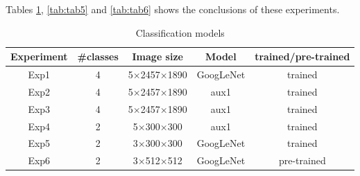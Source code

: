 Tables \ref{tab:tab4}, \ref{tab:tab5} and \ref{tab:tab6} shows the conclusions of these experiments.

\begin{table}[!ht]
    \centering
    \begin{tabular}{|c|c|c|c|c|}
        \hline
        Experiment & \#classes & Image size & Model & trained/pre-trained\\
        \hline\hline
        Exp1 & 4 & 5$\times$2457$\times$1890 & GoogLeNet & trained \\
        \hline
        Exp2 & 4 & 5$\times$2457$\times$1890 & aux1 & trained \\
        \hline
        Exp3 & 4 & 5$\times$2457$\times$1890 & aux1 & trained \\
        \hline
        Exp4 & 2 & 5$\times$300$\times$300 & aux1 & trained \\
        \hline
        Exp5 & 2 & 3$\times$300$\times$300 & GoogLeNet & trained \\
        \hline 
        Exp6 & 2 & 3$\times$512$\times$512 & GoogLeNet & pre-trained \\
        \hline
    \end{tabular}
    \caption{Classification models}
    \label{tab:tab4}
\end{table}

